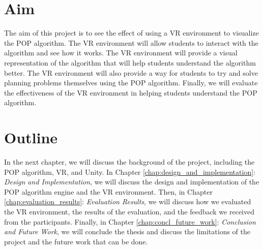 \section{Aim}

The aim of this project is to see the effect of using a \ac{VR} environment to visualize the \ac{POP} algorithm. The \ac{VR} environment will allow students to interact with the algorithm and see how it works. The \ac{VR} environment will provide a visual representation of the algorithm that will help students understand the algorithm better. The \ac{VR} environment will also provide a way for students to try and solve planning problems themselves using the \ac{POP} algorithm. Finally, we will evaluate the effectiveness of the \ac{VR} environment in helping students understand the \ac{POP} algorithm.

\section{Outline}
In the next chapter, we will discuss the background of the project, including the \ac{POP} algorithm, \ac{VR}, and Unity. In Chapter \ref{chap:design_and_implementation}: \textit{Design and Implementation}, we will discuss the design and implementation of the \ac{POP} algorithm engine and the \ac{VR} environment. Then, in Chapter \ref{chap:evaluation_results}: \textit{Evaluation Results}, we will discuss how we evaluated the \ac{VR} environment, the results of the evaluation, and the feedback we received from the participants. Finally, in Chapter \ref{chap:concl_future_work}: \textit{Conclusion and Future Work}, we will conclude the thesis and discuss the limitations of the project and the future work that can be done.



